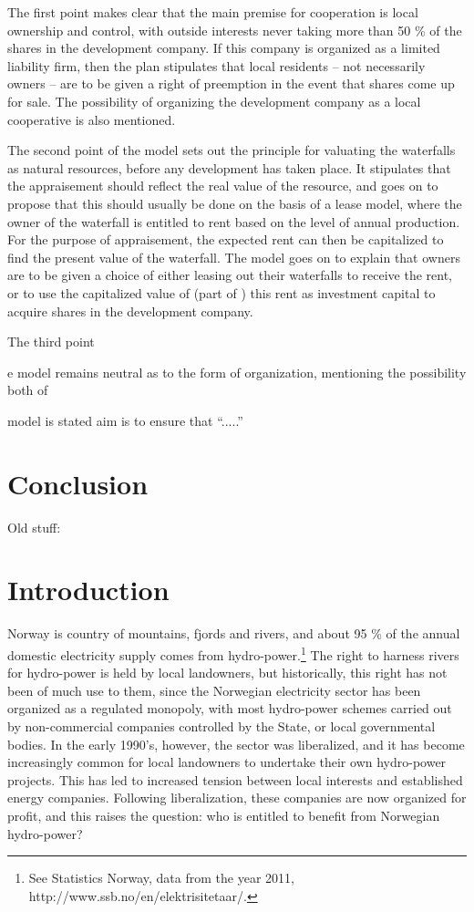 The first point makes clear that the main premise for cooperation is local ownership and control, with outside interests never taking more than 50 \% of the shares in the development company. If this company is organized as a limited liability firm, then the plan stipulates that local residents -- not necessarily owners -- are to be given a right of preemption in the event that shares come up for sale.
The possibility of organizing the development company as a local cooperative is also mentioned. 

The second point of the model sets out the principle for valuating the waterfalls as natural resources, before any development has taken place. It stipulates that the appraisement should reflect the real value of the resource, and goes on to propose that this should usually be done on the basis of a lease model, where the owner of the waterfall is entitled to rent based on the level of annual production. For the purpose of appraisement, the expected rent can then be capitalized to find the present value of the waterfall. The model goes on to explain that owners are to be given a choice of either leasing out their waterfalls to receive the rent, or to use the capitalized value of (part of ) this rent as investment capital to acquire shares in the development company.

The third point 

e model remains neutral as to the form of organization, mentioning the possibility both of 

model is stated aim is to ensure that ``.....''


\section{Conclusion}

Old stuff:

\section{Introduction}\label{intro}

Norway is country of mountains, fjords and rivers, and about 95 \% of the annual domestic electricity supply comes from hydro-power.\footnote{See Statistics Norway, data from the year 2011, http://www.ssb.no/en/elektrisitetaar/.} The right to harness rivers for hydro-power is held by local landowners, but historically, this right has not been of much use to them, since the Norwegian electricity sector has been organized as a regulated monopoly, with most hydro-power schemes carried out by non-commercial companies controlled by the State, or local governmental bodies. In the early 1990's, however, the sector was liberalized, and it has become increasingly common for local landowners to undertake their own hydro-power projects. This has led to increased tension between local interests and established energy companies. Following liberalization, these companies are now organized for profit, and this raises the question: who is entitled to benefit from Norwegian hydro-power? 

